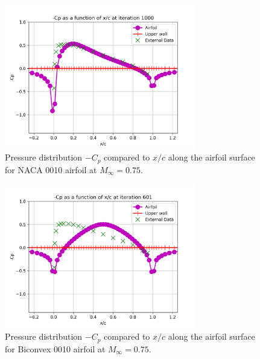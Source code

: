 \documentclass[12pt]{article}
\theoremstyle{definition}
\begin{document}
\begin{figure}
    \centering
    \includegraphics[width=0.75\textwidth,height=\textwidth,keepaspectratio]{images/pressure_coefficient-2.png}
    \caption{Pressure distribution $-C_p$ compared to $x/c$ along the airfoil surface for NACA 0010 airfoil at $M_\infty = 0.75$.}
    \label{fig:pressure_coefficient-2}
\end{figure}

\begin{figure}
    \centering
    \includegraphics[width=0.75\textwidth,height=\textwidth,keepaspectratio]{images/pressure_coefficient-3.png}
    \caption{Pressure distribution $-C_p$ compared to $x/c$ along the airfoil surface for Biconvex 0010 airfoil at $M_\infty = 0.75$.}
    \label{fig:pressure_coefficient-3}
\end{figure}
\end{document}
